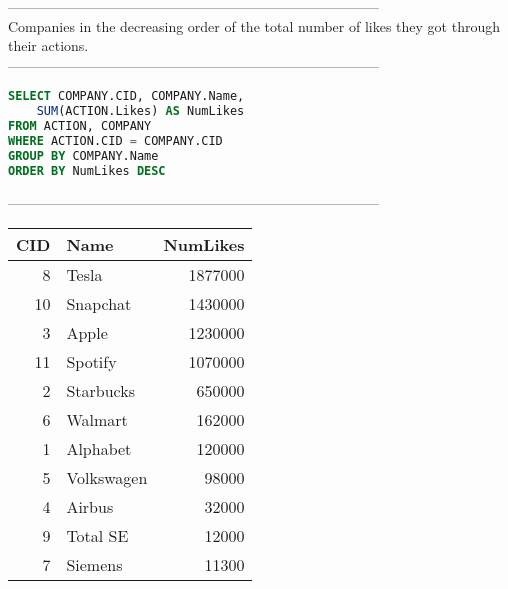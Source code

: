 --------------------------------------------------------------------------------
\\Companies in the decreasing order of the total number of likes they got through their actions.\\
--------------------------------------------------------------------------------
\begin{lstlisting}[language = SQL]
SELECT COMPANY.CID, COMPANY.Name, 
	SUM(ACTION.Likes) AS NumLikes 
FROM ACTION, COMPANY 
WHERE ACTION.CID = COMPANY.CID 
GROUP BY COMPANY.Name 
ORDER BY NumLikes DESC
\end{lstlisting}
--------------------------------------------------------------------------------
\\\begin{tabular}{rlr}
\toprule
   CID & Name       &   NumLikes \\
\midrule
     8 & Tesla      &    1877000 \\
    10 & Snapchat   &    1430000 \\
     3 & Apple      &    1230000 \\
    11 & Spotify    &    1070000 \\
     2 & Starbucks  &     650000 \\
     6 & Walmart    &     162000 \\
     1 & Alphabet   &     120000 \\
     5 & Volkswagen &      98000 \\
     4 & Airbus     &      32000 \\
     9 & Total SE   &      12000 \\
     7 & Siemens    &      11300 \\
\bottomrule
\end{tabular}